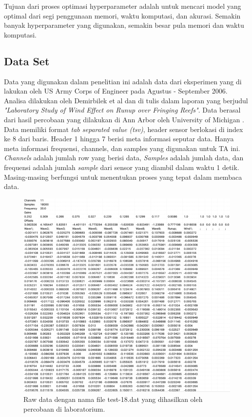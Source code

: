 Tujuan dari proses optimasi hyperparameter adalah untuk mencari model yang optimal dari segi penggunaan memori, waktu komputasi, dan akurasi. Semakin banyak hyperparameter yang digunakan, semakin besar pula memori dan waktu komputasi.

\subsection{Data Set}
Data yang digunakan dalam penelitian ini adalah data dari eksperimen yang di lakukan oleh US Army Corps of Engineer pada Agustus - September 2006. Analisa dilakukan oleh Demirbilek et al dan di tulis dalam laporan yang berjudul \emph{"Laboratory Study of Wind Effect on Runup over Fringing Reefs"}. Data berasal dari hasil percobaan yang dilakukan di Ann Arbor oleh University of Michigan \cite{TechnicalReports}. Data memiliki format \emph{tab separated value (tsv)}, header sensor berlokasi di 
index ke 8 dari baris. Header 1 hingga 7 berisi meta informasi seputar data. Hanya meta informasi frequensi, channels, dan samples yang digunakan untuk TA ini. \emph{Channels} adalah jumlah row yang berisi data, \emph{Samples} adalah jumlah data, dan frequensi adalah jumlah \emph{sample} dari sensor yang diambil dalam waktu 1 detik. Masing-masing berfungsi untuk menentukan proses yang tepat dalam membaca data.
\FloatBarrier
\begin{figure}[h]
  \begin{center}
    \includegraphics[scale=0.3]{./images/raw_data_test-18.png}
  \end{center}
  \caption{Raw data dengan nama file test-18.dat yang dihasilkan oleh percobaan di laboratorium.}
  \label{fig:raw_data_18}
\end{figure}
\FloatBarrier

